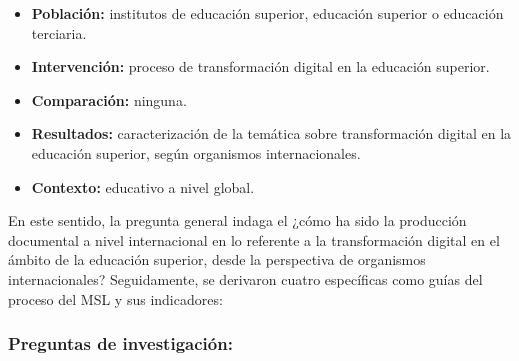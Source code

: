         \begin{itemize}
        \item
        \textbf{Población:} institutos de educación superior, educación
        superior o educación terciaria.
        \item
        \textbf{Intervención:} proceso de transformación digital en la
        educación superior.
        \item
        \textbf{Comparación:} ninguna.
        \item
        \textbf{Resultados:} caracterización de la temática sobre
        transformación digital en la educación superior, según organismos
        internacionales.
        \item
        \textbf{Contexto:} educativo a nivel global.
        \end{itemize}

        En este sentido, la pregunta general indaga el ¿cómo ha sido la
        producción documental a nivel internacional en lo referente a la
        transformación digital en el ámbito de la educación superior, desde la
        perspectiva de organismos internacionales? Seguidamente, se derivaron
        cuatro específicas como guías del proceso del MSL y sus indicadores:

        \subsubsection{Preguntas de investigación:}\label{sub-sub-sec-preguntas-de-investigacion}

